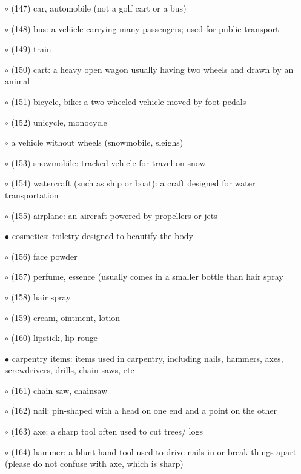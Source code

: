 \noindent \leftskip=0.5cm $\circ$ (147) car, automobile (not a golf cart or a bus)

\noindent \leftskip=0.5cm $\circ$ (148) bus: a vehicle carrying many passengers; used for public transport

\noindent \leftskip=0.5cm $\circ$ (149) train

\noindent \leftskip=0.5cm $\circ$ (150) cart: a heavy open wagon usually having two wheels and drawn by an animal

\noindent \leftskip=0.5cm $\circ$ (151) bicycle, bike: a two wheeled vehicle moved by foot pedals

\noindent \leftskip=0.5cm $\circ$ (152) unicycle, monocycle

\noindent \leftskip=0.25cm $\circ$ a vehicle without wheels (snowmobile, sleighs)

\noindent \leftskip=0.5cm $\circ$ (153) snowmobile: tracked vehicle for travel on snow

\noindent \leftskip=0.5cm $\circ$ (154) watercraft (such as ship or boat): a craft designed for water transportation

\noindent \leftskip=0.25cm $\circ$ (155) airplane: an aircraft powered by propellers or jets

\noindent \leftskip=0.0cm $\bullet$ cosmetics: toiletry designed to beautify the body

\noindent \leftskip=0.25cm $\circ$ (156) face powder

\noindent \leftskip=0.25cm $\circ$ (157) perfume, essence (usually comes in a smaller bottle than hair spray

\noindent \leftskip=0.25cm $\circ$ (158) hair spray

\noindent \leftskip=0.25cm $\circ$ (159) cream, ointment, lotion

\noindent \leftskip=0.25cm $\circ$ (160) lipstick, lip rouge

\noindent \leftskip=0.0cm $\bullet$ carpentry items: items used in carpentry, including nails, hammers, axes, screwdrivers, drills, chain saws, etc

\noindent \leftskip=0.25cm $\circ$ (161) chain saw, chainsaw

\noindent \leftskip=0.25cm $\circ$ (162) nail: pin-shaped with a head on one end and a point on the other

\noindent \leftskip=0.25cm $\circ$ (163) axe: a sharp tool often used to cut trees/ logs

\noindent \leftskip=0.25cm $\circ$ (164) hammer: a blunt hand tool used to drive nails in or break things apart (please do not confuse with axe, which is sharp)

